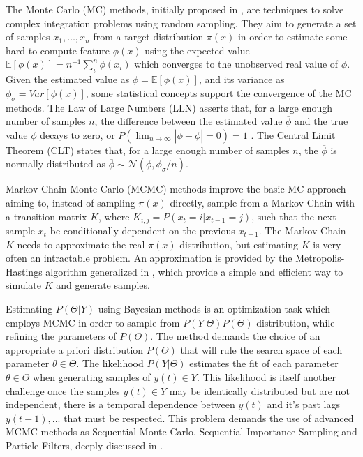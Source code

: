 The Monte Carlo (MC) methods, initially proposed in \cite{Metropolis1949}, are techniques to solve complex  integration problems using random sampling. They aim to generate a set of samples $x_1,\ldots,x_n$ from a target distribution $\pi(x)$ in order to estimate some hard-to-compute feature $\phi(x)$ using the expected value $\mathbb{E}[\phi(x)] = n^{-1}\sum_i^n \phi(x_i)$ which converges to the unobserved real value of $\phi$. Given the estimated value as $\overline{\phi} = \mathbb{E}[\phi(x)]$, and its variance as $\phi_\sigma = Var[\phi(x)]$, some statistical concepts support the convergence of the MC methods. The Law of Large Numbers (LLN) asserts that, for a large enough number of samples $n$, the difference between the estimated value $\overline{\phi}$ and the true value $\phi$ decays to zero, or $P(\lim_{n\to\infty} |\overline{\phi} - \phi| = 0) = 1$ . The Central Limit Theorem (CLT) states that, for a large enough number of samples $n$, the $\overline{\phi}$ is normally distributed as $\overline{\phi} \sim \mathcal{N}(\phi,\phi_\sigma/n)$.

Markov Chain Monte Carlo (MCMC) methods improve the basic MC approach aiming to, instead of sampling $\pi(x)$ directly, sample from a Markov Chain with a transition matrix $K$, where $K_{i,j} = P(x_t = i|x_{t-1} = j)$, such that the next sample $x_t$ be conditionally dependent on the previous $x_{t-1}$. The Markov Chain $K$ needs to approximate the real $\pi(x)$ distribution, but estimating $K$ is very often an intractable problem. An approximation is provided by the Metropolis-Hastings algorithm generalized in \cite{Hastings1970}, which provide a simple and efficient way to simulate $K$ and generate samples. 

Estimating $P(\Theta|Y)$ using Bayesian methods is an optimization task which employs MCMC in order to sample from $P(Y|\Theta)P(\Theta)$ distribution, while refining the parameters of $P(\Theta)$. The method demands the choice of an appropriate a priori distribution $P(\Theta)$ that will rule the search space of each parameter $\theta \in \Theta$. The likelihood $P(Y|\Theta)$ estimates the fit of each parameter $\theta \in \Theta$ when generating samples of $y(t)\in Y$. This likelihood is itself another challenge once the samples $y(t)\in Y$ may be identically distributed but are not independent, there is a temporal dependence between $y(t)$ and it's past lags $y(t-1),...$ that must be respected. This problem demands the use of advanced MCMC methods as Sequential Monte Carlo, Sequential Importance Sampling and Particle Filters, deeply discussed in \cite{Smith2013}.

